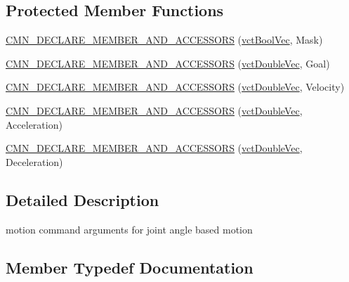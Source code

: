 \subsection*{Protected Member Functions}
\begin{DoxyCompactItemize}
\item 
\hyperlink{classprm_position_joint_set_ada5c1289e193a40555f3b44fb2ad76d9}{C\+M\+N\+\_\+\+D\+E\+C\+L\+A\+R\+E\+\_\+\+M\+E\+M\+B\+E\+R\+\_\+\+A\+N\+D\+\_\+\+A\+C\+C\+E\+S\+S\+O\+R\+S} (\hyperlink{vct_dynamic_vector_types_8h_aeb2237c134aee3769198bd9d55c8a9e0}{vct\+Bool\+Vec}, Mask)
\item 
\hyperlink{classprm_position_joint_set_aab14afd4e0a4265ba9d5cbb80536fc63}{C\+M\+N\+\_\+\+D\+E\+C\+L\+A\+R\+E\+\_\+\+M\+E\+M\+B\+E\+R\+\_\+\+A\+N\+D\+\_\+\+A\+C\+C\+E\+S\+S\+O\+R\+S} (\hyperlink{vct_dynamic_vector_types_8h_ade4b3068c86fb88f41af2e5187e491c2}{vct\+Double\+Vec}, Goal)
\item 
\hyperlink{classprm_position_joint_set_ae24e2aa020e3ef9537ccc17ff55fd5d4}{C\+M\+N\+\_\+\+D\+E\+C\+L\+A\+R\+E\+\_\+\+M\+E\+M\+B\+E\+R\+\_\+\+A\+N\+D\+\_\+\+A\+C\+C\+E\+S\+S\+O\+R\+S} (\hyperlink{vct_dynamic_vector_types_8h_ade4b3068c86fb88f41af2e5187e491c2}{vct\+Double\+Vec}, Velocity)
\item 
\hyperlink{classprm_position_joint_set_aceb5a01265725a71104cb269459b0c8d}{C\+M\+N\+\_\+\+D\+E\+C\+L\+A\+R\+E\+\_\+\+M\+E\+M\+B\+E\+R\+\_\+\+A\+N\+D\+\_\+\+A\+C\+C\+E\+S\+S\+O\+R\+S} (\hyperlink{vct_dynamic_vector_types_8h_ade4b3068c86fb88f41af2e5187e491c2}{vct\+Double\+Vec}, Acceleration)
\item 
\hyperlink{classprm_position_joint_set_a5cc46da95e7d7d8ca59b29bcdd194001}{C\+M\+N\+\_\+\+D\+E\+C\+L\+A\+R\+E\+\_\+\+M\+E\+M\+B\+E\+R\+\_\+\+A\+N\+D\+\_\+\+A\+C\+C\+E\+S\+S\+O\+R\+S} (\hyperlink{vct_dynamic_vector_types_8h_ade4b3068c86fb88f41af2e5187e491c2}{vct\+Double\+Vec}, Deceleration)
\end{DoxyCompactItemize}


\subsection{Detailed Description}
motion command arguments for joint angle based motion 

\subsection{Member Typedef Documentation}
\hypertarget{classprm_position_joint_set_a6e9b539600bf96ea6bad0516f577e7c2}{}
